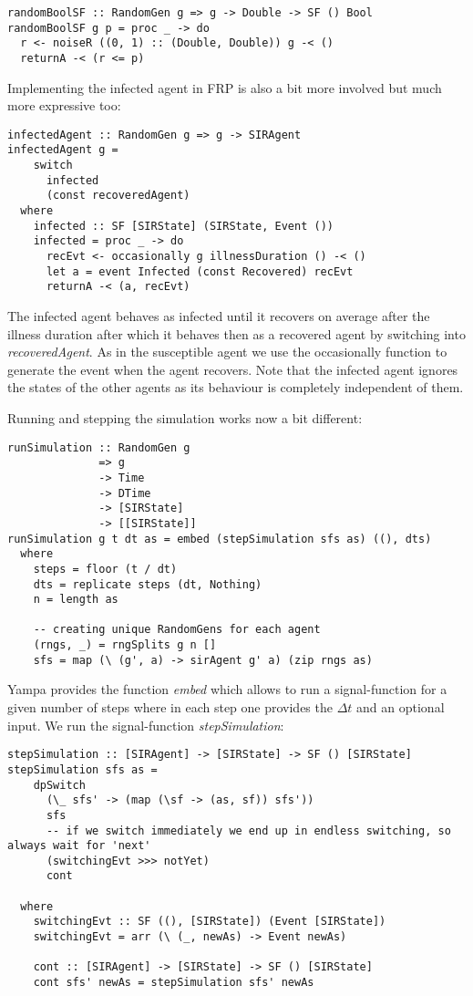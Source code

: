 \begin{verbatim}
randomBoolSF :: RandomGen g => g -> Double -> SF () Bool
randomBoolSF g p = proc _ -> do
  r <- noiseR ((0, 1) :: (Double, Double)) g -< ()
  returnA -< (r <= p)
\end{verbatim}

Implementing the infected agent in FRP is also a bit more involved but much more expressive too:

\begin{verbatim}
infectedAgent :: RandomGen g => g -> SIRAgent
infectedAgent g = 
    switch 
      infected 
      (const recoveredAgent)
  where
    infected :: SF [SIRState] (SIRState, Event ())
    infected = proc _ -> do
      recEvt <- occasionally g illnessDuration () -< ()
      let a = event Infected (const Recovered) recEvt
      returnA -< (a, recEvt)
\end{verbatim}

The infected agent behaves as infected until it recovers on average after the illness duration after which it behaves then as a recovered agent by switching into \textit{recoveredAgent}. As in the susceptible agent we use the occasionally function to generate the event when the agent recovers. Note that the infected agent ignores the states of the other agents as its behaviour is completely independent of them.

Running and stepping the simulation works now a bit different:

\begin{verbatim}
runSimulation :: RandomGen g 
              => g 
              -> Time 
              -> DTime 
              -> [SIRState] 
              -> [[SIRState]]
runSimulation g t dt as = embed (stepSimulation sfs as) ((), dts)
  where
    steps = floor (t / dt)
    dts = replicate steps (dt, Nothing)
    n = length as

	-- creating unique RandomGens for each agent
    (rngs, _) = rngSplits g n [] 
    sfs = map (\ (g', a) -> sirAgent g' a) (zip rngs as)
\end{verbatim}

Yampa provides the function \textit{embed} which allows to run a signal-function for a given number of steps where in each step one provides the $\Delta t$ and an optional input. We run the signal-function \textit{stepSimulation}:

\begin{verbatim}
stepSimulation :: [SIRAgent] -> [SIRState] -> SF () [SIRState]
stepSimulation sfs as =
    dpSwitch
      (\_ sfs' -> (map (\sf -> (as, sf)) sfs'))
      sfs
      -- if we switch immediately we end up in endless switching, so always wait for 'next'
      (switchingEvt >>> notYet) 
      cont

  where
    switchingEvt :: SF ((), [SIRState]) (Event [SIRState])
    switchingEvt = arr (\ (_, newAs) -> Event newAs)

    cont :: [SIRAgent] -> [SIRState] -> SF () [SIRState]
    cont sfs' newAs = stepSimulation sfs' newAs
\end{verbatim}

